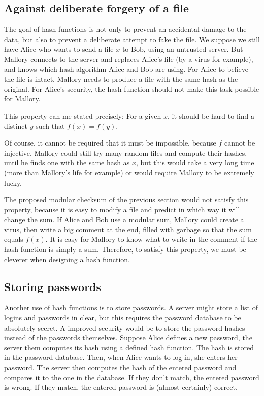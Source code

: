 \documentclass[12pt,a4paper]{article}
\begin{document}
\subsection{Against deliberate forgery of a file}
The goal of hash functions is not only to prevent an accidental damage to the data, but also to prevent a deliberate attempt to fake the file. We suppose we still have Alice who wants to send a file $x$ to Bob, using an untrusted server. But Mallory connects to the server and replaces Alice's file (by a virus for example), and knows which hash algorithm Alice and Bob are using. For Alice to believe the file is intact, Mallory needs to produce a file with the same hash as the original. For Alice's security, the hash function should not make this task possible for Mallory.

This property can me stated precisely: For a given $x$, it should be hard to find a distinct $y$ such that $f(x)=f(y)$.

Of course, it cannot be required that it must be impossible, because $f$ cannot be injective. Mallory could still try many random files and compute their hashes, until he finds one with the same hash as $x$, but this would take a very long time (more than Mallory's life for example) or would require Mallory to be extremely lucky.

The proposed modular checksum of the previous section would not satisfy this property, because it is easy to modify a file and predict in which way it will change the sum. If Alice and Bob use a modular sum, Mallory could create a virus, then write a big comment at the end, filled with garbage so that the sum equals $f(x)$. It is easy for Mallory to know what to write in the comment if the hash function is simply a sum. Therefore, to satisfy this property, we must be cleverer when designing a hash function.

\subsection{Storing passwords}
Another use of hash functions is to store passwords. A server might store a list of logins and passwords in clear, but this requires the password database to be absolutely secret. A improved security would be to store the password hashes instead of the passwords themselves. Suppose Alice defines a new password, the server them computes its hash using a defined hash function. The hash is stored in the password database. Then, when Alice wants to log in, she enters her password. The server then computes the hash of the entered password and compares it to the one in the database. If they don't match, the entered password is wrong. If they match, the entered password is (almost certainly) correct.
\end{document}
